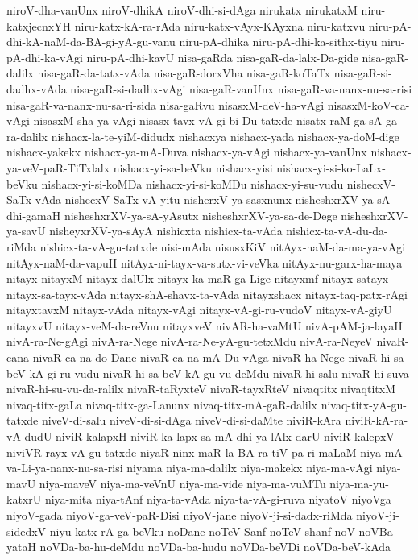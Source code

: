 {niroV-dha-vanUnx
niroV-dhikA
niroV-dhi-si-dAga
nirukatx
nirukatxM
niru-katxjecnxYH
niru-katx-kA-ra-rAda
niru-katx-vAyx-KAyxna
niru-katxvu
niru-pA-dhi-kA-naM-da-BA-gi-yA-gu-vanu
niru-pA-dhika
niru-pA-dhi-ka-sithx-tiyu
niru-pA-dhi-ka-vAgi
niru-pA-dhi-kavU
nisa-gaRda
nisa-gaR-da-lalx-Da-gide
nisa-gaR-dalilx
nisa-gaR-da-tatx-vAda
nisa-gaR-dorxVha
nisa-gaR-koTaTx
nisa-gaR-si-dadhx-vAda
nisa-gaR-si-dadhx-vAgi
nisa-gaR-vanUnx
nisa-gaR-va-nanx-nu-sa-risi
nisa-gaR-va-nanx-nu-sa-ri-sida
nisa-gaRvu
nisasxM-deV-ha-vAgi
nisasxM-koV-ca-vAgi
nisasxM-sha-ya-vAgi
nisasx-tavx-vA-gi-bi-Du-tatxde
nisatx-raM-ga-sA-ga-ra-dalilx
nishacx-la-te-yiM-didudx
nishacxya
nishacx-yada
nishacx-ya-doM-dige
nishacx-yakekx
nishacx-ya-mA-Duva
nishacx-ya-vAgi
nishacx-ya-vanUnx
nishacx-ya-veV-paR-TiTxlalx
nishacx-yi-sa-beVku
nishacx-yisi
nishacx-yi-si-ko-LaLx-beVku
nishacx-yi-si-koMDa
nishacx-yi-si-koMDu
nishacx-yi-su-vudu
nishecxV-SaTx-vAda
nishecxV-SaTx-vA-yitu
nisherxV-ya-sasxnunx
nisheshxrXV-ya-sA-dhi-gamaH
nisheshxrXV-ya-sA-yAsutx
nisheshxrXV-ya-sa-de-Dege
nisheshxrXV-ya-savU
nisheyxrXV-ya-sAyA
nishicxta
nishicx-ta-vAda
nishicx-ta-vA-du-da-riMda
nishicx-ta-vA-gu-tatxde
nisi-mAda
nisusxKiV
nitAyx-naM-da-ma-ya-vAgi
nitAyx-naM-da-vapuH
nitAyx-ni-tayx-va-sutx-vi-veVka
nitAyx-nu-garx-ha-maya
nitayx
nitayxM
nitayx-dalUlx
nitayx-ka-maR-ga-Lige
nitayxmf
nitayx-satayx
nitayx-sa-tayx-vAda
nitayx-shA-shavx-ta-vAda
nitayxshacx
nitayx-taq-patx-rAgi
nitayxtavxM
nitayx-vAda
nitayx-vAgi
nitayx-vA-gi-ru-vudoV
nitayx-vA-giyU
nitayxvU
nitayx-veM-da-reVnu
nitayxveV
nivAR-ha-vaMtU
nivA-pAM-ja-layaH
nivA-ra-Ne-gAgi
nivA-ra-Nege
nivA-ra-Ne-yA-gu-tetxMdu
nivA-ra-NeyeV
nivaR-cana
nivaR-ca-na-do-Dane
nivaR-ca-na-mA-Du-vAga
nivaR-ha-Nege
nivaR-hi-sa-beV-kA-gi-ru-vudu
nivaR-hi-sa-beV-kA-gu-vu-deMdu
nivaR-hi-salu
nivaR-hi-suva
nivaR-hi-su-vu-da-ralilx
nivaR-taRyxteV
nivaR-tayxRteV
nivaqtitx
nivaqtitxM
nivaq-titx-gaLa
nivaq-titx-ga-Lanunx
nivaq-titx-mA-gaR-dalilx
nivaq-titx-yA-gu-tatxde
niveV-di-salu
niveV-di-si-dAga
niveV-di-si-daMte
niviR-kAra
niviR-kA-ra-vA-dudU
niviR-kalapxH
niviR-ka-lapx-sa-mA-dhi-ya-lAlx-darU
niviR-kalepxV
niviVR-rayx-vA-gu-tatxde
niyaR-ninx-maR-la-BA-ra-tiV-pa-ri-maLaM
niya-mA-va-Li-ya-nanx-nu-sa-risi
niyama
niya-ma-dalilx
niya-makekx
niya-ma-vAgi
niya-mavU
niya-maveV
niya-ma-veVnU
niya-ma-vide
niya-ma-vuMTu
niya-ma-yu-katxrU
niya-mita
niya-tAnf
niya-ta-vAda
niya-ta-vA-gi-ruva
niyatoV
niyoVga
niyoV-gada
niyoV-ga-veV-paR-Disi
niyoV-jane
niyoV-ji-si-dadx-riMda
niyoV-ji-sidedxV
niyu-katx-rA-ga-beVku
noDane
noTeV-Sanf
noTeV-shanf
noV
noVBa-yataH
noVDa-ba-hu-deMdu
noVDa-ba-hudu
noVDa-beVDi
noVDa-beV-kAda
}

